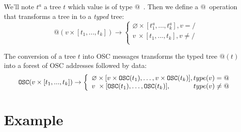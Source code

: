 \documentclass[runningheads,a4paper]{llncs}
\makeatletter
\newcommand{\llist}	[1]		{\ensuremath{[#1_1,...,#1_k]}}
\newcommand{\forest}	{\ensuremath{\varnothing}}
\newcommand{\toType}	{\ensuremath{\mathcal{T}}}
\newcommand{\toAddress}	{\ensuremath{\text{@}}}
\newcommand{\toOSCAddress}	{\ensuremath{\texttt{OSC}}}
\newcommand{\taddress}	{\ensuremath{\text{@}}}
\newcommand{\toData}	{\ensuremath{\text{D}}}
\newcommand{\tdata}	    {\ensuremath{\text{D}}}
\newcommand{\etc}		{\ensuremath{\text{…}}}
\makeatother
\begin{document}
We'll note $t^a$ a tree $t$ which value is of type \taddress\ .
Then we define a \toAddress\ operation that transforms a tree in to a \emph{typed} tree:
\[
    \toAddress (v \times \llist{t}) \to 
\left\{
\begin{array}{l}
	\forest \times \llist{t^a} , v = /\\
	v \ \times \llist{t} , v \neq / \\
\end{array}
\right.
\]

The conversion of a tree $t$ into OSC messages transforms the typed tree $\toAddress (t)$ into a forest of OSC addresses followed by data:
\[
    \toOSCAddress (v \times \llist{t}) \to
\left\{
\begin{array}{l}
	\forest \times [ v \times \toOSCAddress(t_1),\etc , v \times \toOSCAddress(t_k)] , type(v) = \taddress\\
	v \ \times [ \toOSCAddress(t_1),\etc , \toOSCAddress(t_k)] , \hspace{12mm} type(v) \neq \taddress \\
\end{array}
\right.
\]








\section{Example}\label{example}
\end{document}
